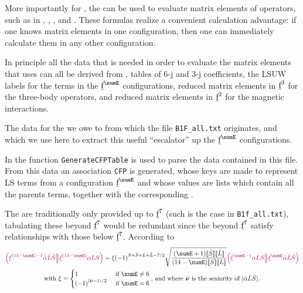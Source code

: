 \documentclass{article}
\newcommand{\codetext}[1]{{\color{BlueViolet} \texttt{#1}}}
\begin{document}
More importantly for \qlanth, the \cfps can be used to evaluate matrix elements of operators, such as in , , , and . These formulas realize a convenient calculation advantage: if one knows matrix elements in one configuration, then one can immediately calculate them in any other configuration.

In principle all the data that is needed in order to evaluate the matrix elements that \qlanth uses can all be derived from \cfps, tables of 6-j and 3-j coefficients, the LSUW labels for the terms in the $\forb^{\numE}$ configurations, reduced matrix elements in $\underbar{$\text{f}$}^3$ for the three-body operators, and reduced matrix elements in $\underbar{$\text{f}$}^2$ for the magnetic interactions. 

The data for the \cfps we owe to \cite{velkov_multi-electron_2000} from which the file \codetext{B1F\_all.txt} originates, and which we use here to extract this useful ``escalator'' up the $\forb^{\numE}$ configurations.

In \qlanth the function \codetext{GenerateCFPTable} is used to parse the data contained in this file. From this data an association \codetext{CFP} is generated, whose keys are made to represent LS terms from a configuration $\forb^{\numE}$ and whose values are lists which contain all the parents terms, together with the corresponding \cfps.



The \cfps are traditionally only provided up to $\underbar{$\text{f}$}^7$ (such is the case in \codetext{B1f\_all.txt}), tabulating these beyond $\underbar{$\text{f}$}^7$ would be redundant since the \cfps beyond $\underbar{$\text{f}$}^7$ satisfy relationships with those below $\underbar{$\text{f}$}^7$. According to \cite{nielson_spectroscopic_1963}
\begin{multline}
\cfp{\lorb^{(14 - \numE)-1}\bar{\alpha}\bar{L}\bar{S}}
			{\lorb^{(14-\numE)}\alpha{LS}} =
			\xi
			\phaser{S+\bar{S}+L+\bar{L}-7/2}
			\sqrt{\frac{(\numE+1)\tpobraket{\bar{S}}\tpobraket{{\bar{L}}}}{(14-\numE)\tpobraket{S}\tpobraket{L}}}
			\cfp{\lorb^{\numE-1}\alpha{LS}}
			{\lorb^{\numE}\bar{\alpha}\bar{L}\bar{S}} \\
\text{with }\xi = \begin{cases}
1 & \text{ if }\numE \neq 6 \\
\phaser{(\bar{\senior} - 1)/2} & \text{ if }\numE = 6
\end{cases}	\text{, and where  $\bar{\senior}$ is the seniority of $\ket{\bar{\alpha} \bar{L}\bar{S} }$.}
\end{multline}
\end{document}
